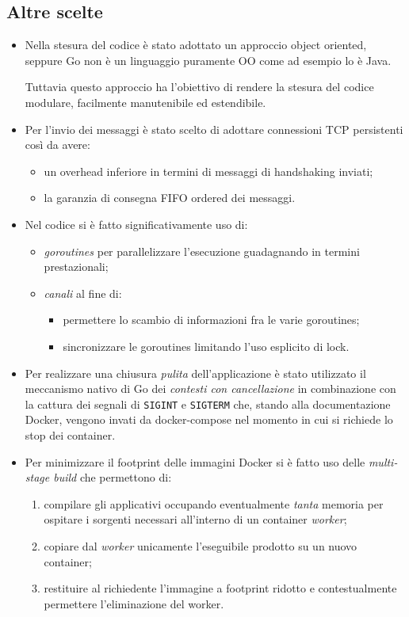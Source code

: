 \documentclass[conference]{IEEEtran}
\begin{document}
\subsection{Altre scelte}
\begin{itemize}
\item Nella stesura del codice è stato adottato un approccio object oriented, seppure Go non è un linguaggio puramente OO come ad esempio lo è Java.

Tuttavia questo approccio ha l'obiettivo di rendere la stesura del codice modulare, facilmente manutenibile ed estendibile.

\item Per l'invio dei messaggi è stato scelto di adottare connessioni TCP persistenti così da avere:
\begin{itemize}
\item un overhead inferiore in termini di messaggi di handshaking inviati;
\item la garanzia di consegna FIFO ordered dei messaggi.
\end{itemize}

\item Nel codice si è fatto significativamente uso di:
\begin{itemize}
\item \textsl{goroutines} per parallelizzare l'esecuzione guadagnando in termini prestazionali;
\item \textsl{canali} al fine di:
\begin{itemize}
\item permettere lo scambio di informazioni fra le varie goroutines;
\item sincronizzare le goroutines limitando l'uso esplicito di lock.
\end{itemize}
\end{itemize}

\item Per realizzare una chiusura \textit{pulita} dell'applicazione è stato utilizzato il meccanismo nativo di Go dei \textit{contesti con cancellazione} in combinazione con la cattura dei segnali di \texttt{SIGINT} e \texttt{SIGTERM} che, stando alla documentazione Docker, vengono invati da docker-compose nel momento in cui si richiede lo stop dei container.

\item Per minimizzare il footprint delle immagini Docker si è fatto uso delle \textsl{multi-stage build} che permettono di:
\begin{enumerate}
\item compilare gli applicativi occupando eventualmente \textit{tanta} memoria per ospitare i sorgenti necessari all'interno di un container \textit{worker};
\item copiare dal \textit{worker} unicamente l'eseguibile prodotto su un nuovo container;
\item restituire al richiedente l'immagine a footprint ridotto e contestualmente permettere l'eliminazione del worker.
\end{enumerate}
\end{itemize}
\end{document}

